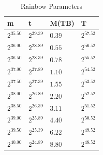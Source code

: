 \begin{table}[H]
  \centering
  \begin{tabular}{llll}
    m & t & M(TB) & T \\ \hline
    $2^{35.50}$ & $2^{29.39}$ & $0.39$ & $2^{57.52}$ \\
    $2^{36.00}$ & $2^{28.89}$ & $0.55$ & $2^{56.52}$ \\
    $2^{36.50}$ & $2^{28.39}$ & $0.78$ & $2^{55.52}$ \\
    $2^{37.00}$ & $2^{27.89}$ & $1.10$ & $2^{54.52}$ \\
    $2^{37.50}$ & $2^{27.39}$ & $1.55$ & $2^{53.52}$ \\
    $2^{38.00}$ & $2^{26.89}$ & $2.20$ & $2^{52.52}$ \\
    $2^{38.50}$ & $2^{26.39}$ & $3.11$ & $2^{51.52}$ \\
    $2^{39.00}$ & $2^{25.89}$ & $4.40$ & $2^{50.52}$ \\
    $2^{39.50}$ & $2^{25.39}$ & $6.22$ & $2^{49.52}$ \\
    $2^{40.00}$ & $2^{24.89}$ & $8.80$ & $2^{48.52}$ \\
  \end{tabular}
  \caption{Rainbow Parameters}
  \label{tab:rainparam}
\end{table}
